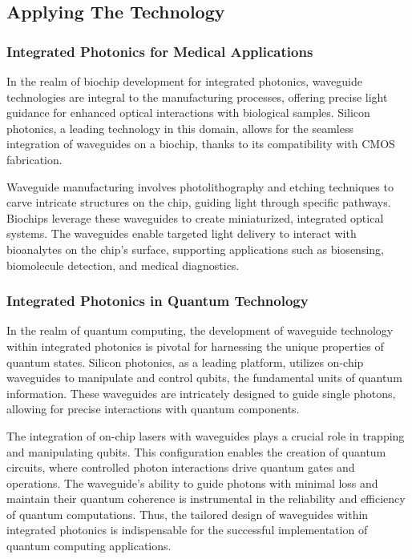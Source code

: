 \documentclass[10pt]{article}
\begin{document}
\subsection{Applying The Technology}
\subsubsection{Integrated Photonics for Medical Applications}
In the realm of biochip development for integrated photonics, waveguide technologies are integral to the manufacturing processes, offering precise light guidance for enhanced optical interactions with biological samples. Silicon photonics, a leading technology in this domain, allows for the seamless integration of waveguides on a biochip, thanks to its compatibility with CMOS fabrication.


Waveguide manufacturing involves photolithography and etching techniques to carve intricate structures on the chip, guiding light through specific pathways. Biochips leverage these waveguides to create miniaturized, integrated optical systems. The waveguides enable targeted light delivery to interact with bioanalytes on the chip's surface, supporting applications such as biosensing, biomolecule detection, and medical diagnostics.
\subsubsection{Integrated Photonics in Quantum Technology}
In the realm of quantum computing, the development of waveguide technology within integrated photonics is pivotal for harnessing the unique properties of quantum states. Silicon photonics, as a leading platform, utilizes on-chip waveguides to manipulate and control qubits, the fundamental units of quantum information. These waveguides are intricately designed to guide single photons, allowing for precise interactions with quantum components.


The integration of on-chip lasers with waveguides plays a crucial role in trapping and manipulating qubits. This configuration enables the creation of quantum circuits, where controlled photon interactions drive quantum gates and operations. The waveguide's ability to guide photons with minimal loss and maintain their quantum coherence is instrumental in the reliability and efficiency of quantum computations.
Thus, the tailored design of waveguides within integrated photonics is indispensable for the successful implementation of quantum computing applications.
\end{document}
